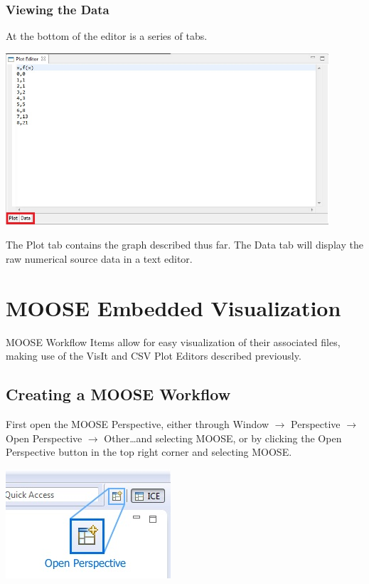 \documentclass{article}
\begin{document}
\subsubsection{Viewing the Data}

At the bottom of the editor is a series of tabs.

\begin{center}
\includegraphics[width=12cm]{images/CSVTabs}
\end{center}

The Plot tab contains the graph described thus far. The Data tab will display
the raw numerical source data in a text editor. 

\section{MOOSE Embedded Visualization}

MOOSE Workflow Items allow for easy visualization of their associated files,
making use of the VisIt and CSV Plot Editors described previously.

\subsection{Creating a MOOSE Workflow}

First open the MOOSE Perspective, either through Window $\rightarrow$
Perspective $\rightarrow$ Open Perspective $\rightarrow$ Other\ldots and
selecting MOOSE, or by clicking the Open Perspective button in the top right
corner and selecting MOOSE.

\begin{center}
\includegraphics{images/ICE_OpenPerspective}
\end{center}
\end{document}
